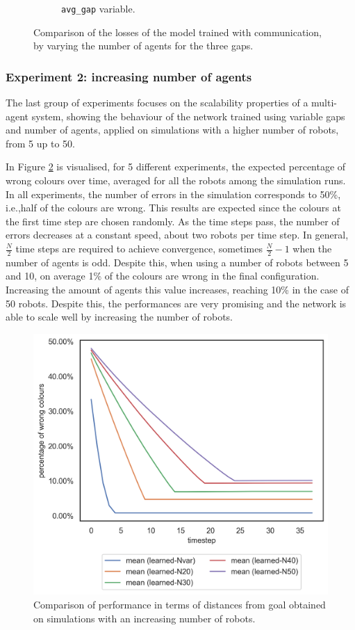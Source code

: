 \begin{figure}[!htb]
\begin{center}
\begin{subfigure}[h]{0.32\textwidth}
			\caption{\texttt{avg\_gap} variable.}
		\end{subfigure}
	\end{center}
	\vspace{-0.5cm}
	\caption[Losses summary of the second task 
	(communication).]{Comparison of the losses of the model trained with 
	communication, by varying the number of agents for the three gaps.}
	\label{fig:commlosst2}
	\vspace{-0.5cm}
\end{figure}

\subsubsection{Experiment 2: increasing number of agents}
\label{subsubsec:task2-exp-comm-2}

The last group of experiments focuses on the scalability properties of a 
multi-agent system, showing the behaviour of the network trained using variable 
gaps and number of agents, applied on simulations with a higher number of 
robots, from 5 up to 50.

In Figure \ref{fig:errorcomm} is visualised, for 5 different experiments, the 
expected percentage of wrong colours over time, averaged for all the robots 
among the simulation runs. 
In all experiments, the number of errors in the simulation corresponds to 50\%, 
i.e.,half of the colours are wrong. This results are expected since the colours at the 
first time step are chosen randomly. As the time steps pass, the number of errors 
decreases at a constant speed, about two robots per time step. In general, 
$\frac{N}{2}$ time steps are required to achieve convergence, sometimes 
$\frac{N}{2} - 1$ when the number of agents is odd. 
Despite this, when using a number of robots between 5 and 10, on average 1\% of 
the colours are wrong in the final configuration. Increasing the amount of agents 
this value increases, reaching 10\% in the case of 50 robots.
Despite this, the performances are very promising and the network is able to scale 
well by increasing the number of robots.
\begin{figure}[!htb]
	\centering
	\includegraphics[width=.5\textwidth]{contents/images/colours-errors-compressed}%
	\caption[Evaluation of distances from goal for a high number of 
	robots.]{Comparison of performance in terms of distances from goal obtained 
		on simulations with an increasing number of robots.}
	\label{fig:errorcomm}
\end{figure}

